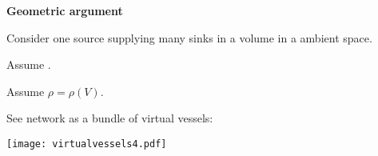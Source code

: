 
  \textbf{Geometric argument}

  
   
    Consider \alert{one source} supplying \alert{many sinks} in a  volume
    in a  ambient space.
  
    Assume .
  
    Assume \alert{$\rho = \rho(V)$}.
   
    See network as a bundle of virtual vessels:
    \begin{center}
              
        
        \texttt{[image: virtualvessels4.pdf]}
          \end{center}
   
